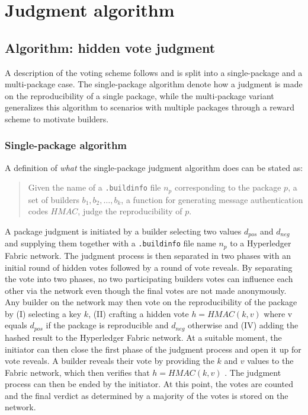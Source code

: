 \chapter{Judgment algorithm}

\section{Algorithm: hidden vote judgment}

A description of the voting scheme follows and is split into a single-package and a multi-package case. The single-package algorithm denote how a judgment is made on the reproducibility of a single package, while the multi-package variant generalizes this algorithm to scenarios with multiple packages through a reward scheme to motivate builders.

\subsection{Single-package algorithm}
\label{subsec:AlgorithmSingle}

A definition of \textit{what} the single-package judgment algorithm does can be stated as:

\begin{quote}
	Given the name of a \texttt{.buildinfo} file $n_p$ corresponding to the package $p$, a set of builders $b_1, b_2, \dotsc, b_k$, a function for generating message authentication codes $HMAC$, judge the reproducibility of $p$.
\end{quote}

A package judgment is initiated by a builder selecting two values $d_{pos}$ and $d_{neg}$ and supplying them together with a \texttt{.buildinfo} file name $n_p$ to a Hyperledger Fabric network. The judgment process is then separated in two phases with an initial round of hidden votes followed by a round of vote reveals. By separating the vote into two phases, no two participating builders votes can influence each other via the network even though the final votes are not made anonymously. Any builder on the network may then vote on the reproducibility of the package by (I) selecting a key $k$, (II) crafting a hidden vote $h = HMAC(k, v)$ where v equals $d_{pos}$ if the package is reproducible and $d_{neg}$ otherwise and (IV) adding the hashed result to the Hyperledger Fabric network. At a suitable moment, the initiator can then close the first phase of the judgment process and open it up for vote reveals. A builder reveals their vote by providing the $k$ and $v$ values to the Fabric network, which then verifies that $h = HMAC(k, v)$ . The judgment process can then be ended by the initiator. At this point, the votes are counted and the final verdict as determined by a majority of the votes is stored on the network.

